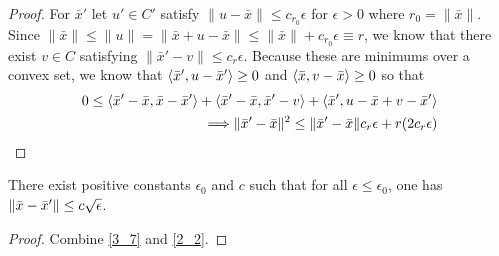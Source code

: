 \begin{proof}
For $\bar x'$ let $u' \in C'$ satisfy $\|u - \bar x\| \le c_{r_0} \epsilon$ for $\epsilon > 0$ where $r_0 = \|\bar x\|$.
Since $\|\bar x \| \le \|u\| = \|\bar x + u - \bar x\| \le \|\bar x \| + c_{r_0} \epsilon \equiv r$, we know that there exist 
$v \in C$ satisfying $\|\bar x' - v\| \le c_r \epsilon$.
Because these are minimums over a convex set, we know that
$\langle {{\bar x}}', u - {{\bar x}}'\rangle \ge 0$ and $\langle{{\bar x}}, v-{{\bar x}}\rangle \ge 0$ so that
\begin{align*}
0 \le \langle {{\bar x}}' - {{\bar x}}, {{\bar x}} - {{\bar x}}'\rangle + \langle {{\bar x}}' - {{\bar x}}, {{\bar x}}'-v\rangle + \langle {{\bar x}}', u - {{\bar x}} + v - {{\bar x}}'\rangle \\
\Longrightarrow \|{{\bar x}} ' - {{\bar x}} \|^2 \le \|{{\bar x}}' - {{\bar x}}\|c_r \epsilon + r(2c_r\epsilon)
\end{align*}

\end{proof}


\begin{theorem}
\label{3_9}
There exist positive constants $\epsilon_0$ and $c$ such that for all $\epsilon \le \epsilon_0$,  one has $\|{{\bar x}} - {{\bar x}}'\| \le c \sqrt{\epsilon}$.
\end{theorem}

\begin{proof}
Combine \cref{3_7} and \cref{2_2}.
\end{proof}
